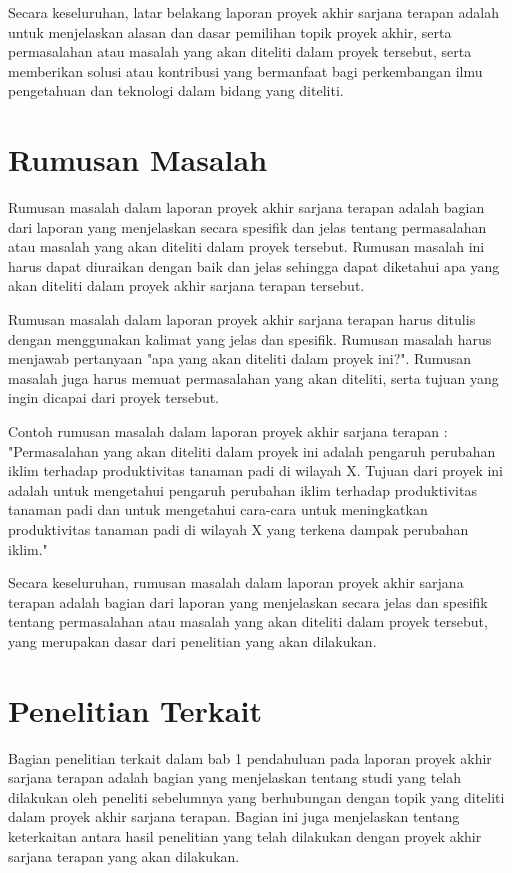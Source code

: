 Secara keseluruhan, latar belakang laporan proyek akhir sarjana terapan adalah untuk menjelaskan alasan dan dasar pemilihan topik proyek akhir, serta permasalahan atau masalah yang akan diteliti dalam proyek tersebut, serta memberikan solusi atau kontribusi yang bermanfaat bagi perkembangan ilmu pengetahuan dan teknologi dalam bidang yang diteliti.


\section{Rumusan Masalah}
Rumusan masalah dalam laporan proyek akhir sarjana terapan adalah bagian dari laporan yang menjelaskan secara spesifik dan jelas tentang permasalahan atau masalah yang akan diteliti dalam proyek tersebut. Rumusan masalah ini harus dapat diuraikan dengan baik dan jelas sehingga dapat diketahui apa yang akan diteliti dalam proyek akhir sarjana terapan tersebut.

Rumusan masalah dalam laporan proyek akhir sarjana terapan harus ditulis dengan menggunakan kalimat yang jelas dan spesifik. Rumusan masalah harus menjawab pertanyaan "apa yang akan diteliti dalam proyek ini?". Rumusan masalah juga harus memuat permasalahan yang akan diteliti, serta tujuan yang ingin dicapai dari proyek tersebut.

Contoh rumusan masalah dalam laporan proyek akhir sarjana terapan :
"Permasalahan yang akan diteliti dalam proyek ini adalah pengaruh perubahan iklim terhadap produktivitas tanaman padi di wilayah X. Tujuan dari proyek ini adalah untuk mengetahui pengaruh perubahan iklim terhadap produktivitas tanaman padi dan untuk mengetahui cara-cara untuk meningkatkan produktivitas tanaman padi di wilayah X yang terkena dampak perubahan iklim."

Secara keseluruhan, rumusan masalah dalam laporan proyek akhir sarjana terapan adalah bagian dari laporan yang menjelaskan secara jelas dan spesifik tentang permasalahan atau masalah yang akan diteliti dalam proyek tersebut, yang merupakan dasar dari penelitian yang akan dilakukan.

\section{Penelitian Terkait}
Bagian penelitian terkait dalam bab 1 pendahuluan pada laporan proyek akhir sarjana terapan adalah bagian yang menjelaskan tentang studi yang telah dilakukan oleh peneliti sebelumnya yang berhubungan dengan topik yang diteliti dalam proyek akhir sarjana terapan. Bagian ini juga menjelaskan tentang keterkaitan antara hasil penelitian yang telah dilakukan dengan proyek akhir sarjana terapan yang akan dilakukan.

